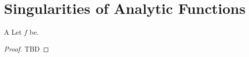 \section{Singularities of Analytic Functions}

\begin{theorem}{A}
    Let $f$ be.
\end{theorem}

\begin{proof}
TBD
\end{proof}
